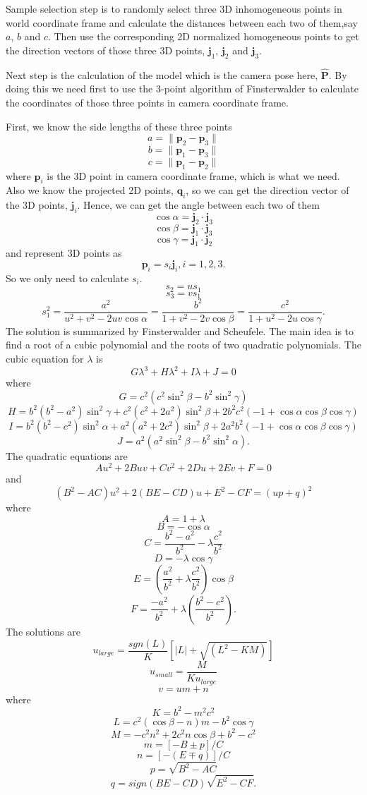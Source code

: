 \documentclass{../../assignment}
\begin{document}
\begin{problemlist}
\begin{enumerate}
Sample selection step is to randomly select three 3D inhomogeneous points in world coordinate frame and calculate the distances between each two of them,say $a$, $b$ and $c$. Then use the corresponding 2D normalized homogeneous points to get the direction vectors of those three 3D points, $\mathbf{j}_1$, $\mathbf{j}_2$ and $\mathbf{j}_3$. 

Next step is the calculation of the model which is the camera pose here, $\hat{\mathbf{P}}$. By doing this we need first to use the 3-point algorithm of Finsterwalder to calculate the coordinates of those three points in camera coordinate frame. 

First, we know the side lengths of these three points
$$a = \|\mathbf{p}_2 - \mathbf{p}_3\|$$
$$b = \|\mathbf{p}_1 - \mathbf{p}_3\|$$
$$c = \|\mathbf{p}_1 - \mathbf{p}_2\|$$
where $\mathbf{p}_i$ is the 3D point in camera coordinate frame, which is what we need. Also we know the projected 2D points, $\mathbf{q}_i$, so we can get the direction vector of the 3D points, $\mathbf{j}_i$. Hence, we can get the angle between each two of them
$$\cos\alpha = \mathbf{j}_2 \cdot \mathbf{j}_3$$
$$\cos\beta = \mathbf{j}_1 \cdot \mathbf{j}_3$$
$$\cos\gamma = \mathbf{j}_1 \cdot \mathbf{j}_2$$
and represent 3D points as
$$\mathbf{p}_i = s_i\mathbf{j}_i, i = 1, 2, 3.$$ So we only need to calculate $s_i$.
$$s_2 = us_1$$
$$s_3 = vs_1$$
$$s_1^2 = \frac{a^2}{u^2+v^2-2uv\cos\alpha} = \frac{b^2}{1+v^2-2v\cos\beta} = \frac{c^2}{1+u^2-2u\cos\gamma}.$$
The solution is summarized by Finsterwalder and Scheufele. The main idea is to find a root of a cubic polynomial and the roots of two quadratic polynomials. The cubic equation for $\lambda$ is
$$G\lambda^3 + H\lambda^2 + I\lambda + J = 0$$
where
$$G = c^2(c^2\sin^2\beta - b^2\sin^2\gamma)$$
$$H = b^2(b^2 - a^2)\sin^2\gamma + c^2(c^2 + 2a^2)\sin^2\beta + 2b^2c^2(-1 + \cos\alpha \cos\beta \cos\gamma)$$
$$I = b^2(b^2 - c^2)\sin^2\alpha + a^2(a^2 + 2c^2)\sin^2\beta + 2a^2b^2(-1 + \cos\alpha \cos\beta \cos\gamma)$$
$$J = a^2(a^2\sin^2\beta - b^2\sin^2\alpha).$$
The quadratic equations are
$$Au^2 + 2Buv + Cv^2 + 2Du + 2E v + F = 0$$
and
$$(B^2 - AC)u^2 + 2(BE - CD)u + E^2 -CF = (up + q)^2$$
where
$$A = 1 + \lambda$$
$$B = -\cos\alpha$$
$$C = \frac{b^2 - a^2}{b^2} - \lambda \frac{c^2}{b^2}$$
$$D = -\lambda \cos\gamma$$
$$E = (\frac{a^2}{b^2} + \lambda \frac{c^2}{b^2})\cos\beta$$
$$F = \frac{-a^2}{b^2} + \lambda (\frac{b^2 - c^2}{b^2}).$$
The solutions are
$$u_{large} = \frac{sgn(L)}{K}[|L| + \sqrt{(L^2 - KM)}]$$
$$u_{small} = \frac{M}{Ku_{large}}$$
$$v = um + n$$
where
$$K = b^2 - m^2c^2$$
$$L = c^2(\cos\beta - n)m - b^2\cos\gamma$$
$$M = -c^2n^2 + 2c^2n\cos\beta + b^2 - c^2$$
$$m = [-B \pm p]/C$$
$$n = [-(E \mp q)]/C$$
$$p = \sqrt{B^2 - AC}$$
$$q = sign(BE - CD)\sqrt{E^2 - CF}.$$


\end{enumerate}
\end{problemlist}
\end{document}
